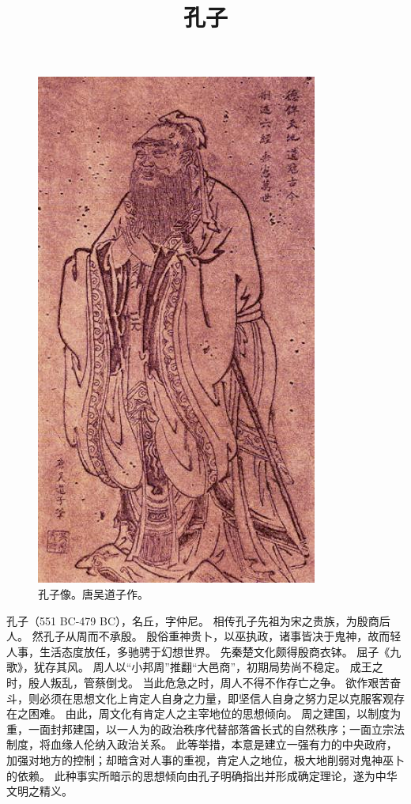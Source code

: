 \documentclass[11pt]{article}
\title{孔子}
\date{}
\begin{document}
  \maketitle
  
  \begin{figure}[H]
    \centering
    \includegraphics[height=\textwidth]{../Figures/Confucius_Tang_Dynasty.jpg}
    \caption{孔子像。唐吴道子作。}
  \end{figure}

  \newpage
  
  \linenumbers


孔子（551 BC-479 BC），名丘，字仲尼。
相传孔子先祖为宋之贵族，为殷商后人。
然孔子从周而不承殷。
殷俗重神贵卜，以巫执政，诸事皆决于鬼神，故而轻人事，生活态度放任，多驰骋于幻想世界。
先秦楚文化颇得殷商衣钵。
屈子《九歌》，犹存其风。
周人以“小邦周”推翻“大邑商”，初期局势尚不稳定。
成王之时，殷人叛乱，管蔡倒戈。
当此危急之时，周人不得不作存亡之争。
欲作艰苦奋斗，则必须在思想文化上肯定人自身之力量，即坚信人自身之努力足以克服客观存在之困难。
由此，周文化有肯定人之主宰地位的思想倾向。
周之建国，以制度为重，一面封邦建国，以一人为的政治秩序代替部落酋长式的自然秩序；一面立宗法制度，将血缘人伦纳入政治关系。
此等举措，本意是建立一强有力的中央政府，加强对地方的控制；却暗含对人事的重视，肯定人之地位，极大地削弱对鬼神巫卜的依赖。
此种事实所暗示的思想倾向由孔子明确指出并形成确定理论，遂为中华文明之精义。
\end{document}
